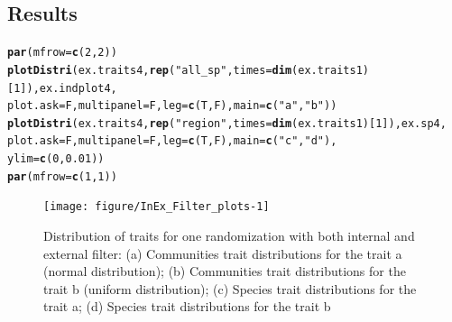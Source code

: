 \documentclass[12pt]{article}\usepackage[]{graphicx}\usepackage[]{color}
\makeatletter
\newcommand{\hlnum}[1]{\textcolor[rgb]{0.686,0.059,0.569}{#1}}%
\newcommand{\hlstr}[1]{\textcolor[rgb]{0.192,0.494,0.8}{#1}}%
\newcommand{\hlstd}[1]{\textcolor[rgb]{0.345,0.345,0.345}{#1}}%
\newcommand{\hlkwc}[1]{\textcolor[rgb]{0.333,0.667,0.333}{#1}}%
\newcommand{\hlkwd}[1]{\textcolor[rgb]{0.737,0.353,0.396}{\textbf{#1}}}%
\newenvironment{kframe}{%
 \def\at@end@of@kframe{}%
 \ifinner\ifhmode%
  \def\at@end@of@kframe{\end{minipage}}%
  \begin{minipage}{\columnwidth}%
 \fi\fi%
 \def\FrameCommand##1{\hskip\@totalleftmargin \hskip-\fboxsep
 \colorbox{shadecolor}{##1}\hskip-\fboxsep
     \hskip-\linewidth \hskip-\@totalleftmargin \hskip\columnwidth}%
 \MakeFramed {\advance\hsize-\width
   \@totalleftmargin\z@ \linewidth\hsize
   \@setminipage}}%
 {\par\unskip\endMakeFramed%
 \at@end@of@kframe}
\newenvironment{knitrout}{}{} %
\makeatother
\begin{document}
  \subsection{Results}
\begin{knitrout}\small
{}\color{fgcolor}\begin{kframe}
\begin{alltt}
\hlkwd{par}\hlstd{(}\hlkwc{mfrow}\hlstd{=}\hlkwd{c}\hlstd{(}\hlnum{2}\hlstd{,} \hlnum{2}\hlstd{))}
\hlkwd{plotDistri}\hlstd{(ex.traits4,} \hlkwd{rep}\hlstd{(}\hlstr{"all_sp"}\hlstd{,} \hlkwc{times} \hlstd{=} \hlkwd{dim}\hlstd{(ex.traits1)[}\hlnum{1}\hlstd{]), ex.indplot4,}
           \hlkwc{plot.ask} \hlstd{= F,} \hlkwc{multipanel} \hlstd{= F,} \hlkwc{leg} \hlstd{=}\hlkwd{c}\hlstd{(T, F),} \hlkwc{main} \hlstd{=} \hlkwd{c}\hlstd{(}\hlstr{"a"}\hlstd{,} \hlstr{"b"}\hlstd{))}
\hlkwd{plotDistri}\hlstd{(ex.traits4,} \hlkwd{rep}\hlstd{(}\hlstr{"region"}\hlstd{,} \hlkwc{times} \hlstd{=} \hlkwd{dim}\hlstd{(ex.traits1)[}\hlnum{1}\hlstd{]), ex.sp4,}
           \hlkwc{plot.ask} \hlstd{= F,} \hlkwc{multipanel} \hlstd{= F,} \hlkwc{leg} \hlstd{=}\hlkwd{c}\hlstd{(T, F),} \hlkwc{main} \hlstd{=} \hlkwd{c}\hlstd{(}\hlstr{"c"}\hlstd{,} \hlstr{"d"}\hlstd{),}
           \hlkwc{ylim} \hlstd{=} \hlkwd{c}\hlstd{(}\hlnum{0}\hlstd{,} \hlnum{0.01}\hlstd{))}
\hlkwd{par}\hlstd{(}\hlkwc{mfrow}\hlstd{=}\hlkwd{c}\hlstd{(}\hlnum{1}\hlstd{,} \hlnum{1}\hlstd{))}
\end{alltt}
\end{kframe}\begin{figure}

{\centering \texttt{[image: figure/InEx\_Filter\_plots-1]} 

}

\caption[Distribution of traits for one randomization with both internal and external filter]{Distribution of traits for one randomization with both internal and external filter: (a) Communities trait distributions for the trait a (normal distribution); (b) Communities trait distributions for the trait b (uniform distribution); (c) Species trait distributions for the trait a; (d) Species trait distributions for the trait b\label{fig:InEx_Filter_plots}}
\end{figure}


\end{knitrout}
\end{document}
